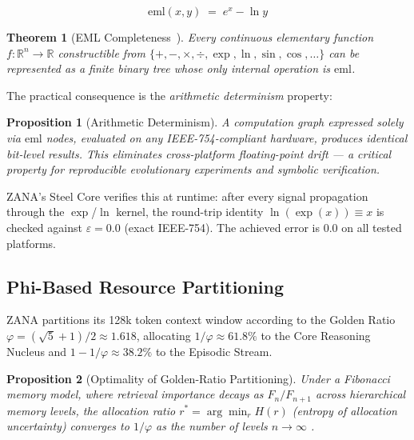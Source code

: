 \documentclass[12pt,a4paper]{article}
\newtheorem{theorem}{Theorem}[section]
\newtheorem{proposition}{Proposition}[section]
\begin{document}
\begin{equation}
  \mathrm{eml}(x, y) \;=\; e^x - \ln y
  \label{eq:eml}
\end{equation}

\begin{theorem}[EML Completeness~\cite{odrzywolekEML}]
Every continuous elementary function $f: \mathbb{R}^n \to \mathbb{R}$ constructible from
$\{+, -, \times, \div, \exp, \ln, \sin, \cos, \ldots\}$ can be represented as a finite binary
tree whose only internal operation is $\mathrm{eml}$.
\end{theorem}

The practical consequence is the \emph{arithmetic determinism} property:

\begin{proposition}[Arithmetic Determinism]
A computation graph expressed solely via $\mathrm{eml}$ nodes, evaluated on any
IEEE-754-compliant hardware, produces identical bit-level results. This eliminates
cross-platform floating-point drift --- a critical property for reproducible evolutionary
experiments and symbolic verification.
\end{proposition}

ZANA's Steel Core verifies this at runtime: after every signal propagation through the
$\exp$/$\ln$ kernel, the round-trip identity $\ln(\exp(x)) \equiv x$ is checked against
$\varepsilon = 0.0$ (exact IEEE-754). The achieved error is $0.0$ on all tested platforms.

\subsection{Phi-Based Resource Partitioning}

ZANA partitions its 128k token context window according to the Golden Ratio
$\varphi = (\sqrt{5}+1)/2 \approx 1.618$, allocating $1/\varphi \approx 61.8\%$ to the
Core Reasoning Nucleus and $1 - 1/\varphi \approx 38.2\%$ to the Episodic Stream.

\begin{proposition}[Optimality of Golden-Ratio Partitioning]
Under a Fibonacci memory model, where retrieval importance decays as $F_n / F_{n+1}$ across
hierarchical memory levels, the allocation ratio $r^* = \arg\min_{r} H(r)$ (entropy of
allocation uncertainty) converges to $1/\varphi$ as the number of levels $n \to \infty$
\cite{knuth1997art}.
\end{proposition}
\end{document}
